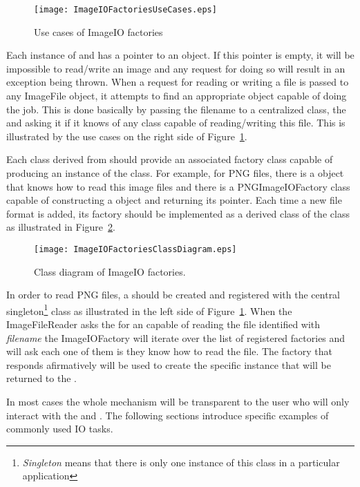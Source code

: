 \begin{figure}
\center
\texttt{[image: ImageIOFactoriesUseCases.eps]}
\caption{Use cases of ImageIO factories}
\label{fig:ImageIOFactoriesUseCases}
\end{figure}


Each instance of  and 
has a pointer to an  object. If this pointer is empty, it will be
impossible to read/write an image and any request for doing so will result in
an exception being thrown. When a request for reading or writing a file is
passed to any ImageFile object, it attempts to find an appropriate
 object capable of doing the job. This is done basically by
passing the filename to a centralized class, the  and
asking it if it knows of any  class capable of reading/writing
this file. This is illustrated by the use cases on the right side of
Figure~\ref{fig:ImageIOFactoriesUseCases}.

Each class derived from  should provide an associated
factory class capable of producing an instance of the  class. For
example, for PNG files, there is a  object that knows how
to read this image files and there is a PNGImageIOFactory class capable of
constructing a  object and returning its pointer. Each time a
new file format is added, its factory should be implemented as a derived class
of the  class as illustrated in
Figure~\ref{fig:ImageIOFactoriesClassDiagram}. 

\begin{figure}
\center
\texttt{[image: ImageIOFactoriesClassDiagram.eps]}
\caption{Class diagram of ImageIO factories.}
\label{fig:ImageIOFactoriesClassDiagram}
\end{figure}

In order to read PNG files, a  should be created and
registered with the central 
singleton\footnote{\emph{Singleton} means that there is only one instance of
this class in a particular application} class as illustrated in the left side
of Figure~\ref{fig:ImageIOFactoriesUseCases}. When the ImageFileReader asks the
 for an  capable of reading the file
identified with \emph{filename} the ImageIOFactory will iterate over the list
of registered factories and will ask each one of them is they know how to read
the file. The factory that responds afirmatively will be used to create the
specific  instance that will be returned to the .

In most cases the whole mechanism will be transparent to the user who will only
interact with the  and . The following
sections introduce specific examples of commonly used IO tasks. 







